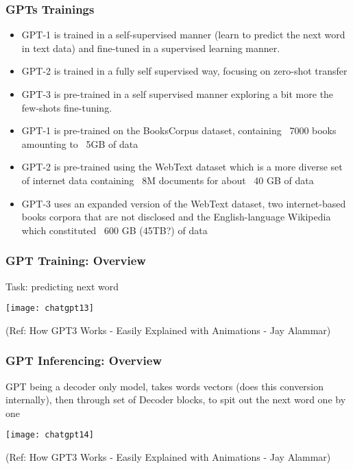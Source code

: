 \begin{frame}[fragile]\frametitle{GPTs Trainings}


\begin{itemize}
\item GPT-1 is trained in a self-supervised manner (learn to predict the next word in text data) and fine-tuned in a supervised learning manner. 
\item GPT-2 is trained in a fully self supervised way, focusing on zero-shot transfer
\item  GPT-3 is pre-trained in a self supervised manner exploring a bit more the few-shots fine-tuning.
\item GPT-1 is pre-trained on the BooksCorpus dataset, containing ~7000 books amounting to ~5GB of data
\item GPT-2 is pre-trained using the WebText dataset which is a more diverse set of internet data containing ~8M documents for about ~40 GB of data
\item GPT-3 uses an expanded version of the WebText dataset, two internet-based books corpora that are not disclosed and the English-language Wikipedia which constituted ~600 GB (45TB?) of data
\end{itemize}	 

\end{frame}

\begin{frame}[fragile]\frametitle{GPT Training: Overview}


Task: predicting next word

\begin{center}
\texttt{[image: chatgpt13]}
\end{center}		


{\tiny (Ref: How GPT3 Works - Easily Explained with Animations - Jay Alammar)}

\end{frame}

\begin{frame}[fragile]\frametitle{GPT Inferencing: Overview}


GPT being a decoder only model, takes words vectors (does this conversion internally), then through set of Decoder blocks, to spit out the next word one by one

\begin{center}
\texttt{[image: chatgpt14]}
\end{center}		


{\tiny (Ref: How GPT3 Works - Easily Explained with Animations - Jay Alammar)}

\end{frame}

